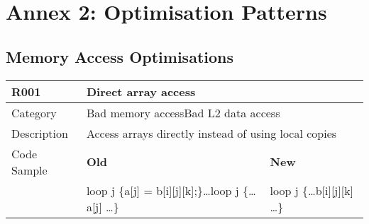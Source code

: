 \chapter{Annex 2: Optimisation Patterns}
\label{ch:ch07_optimization_patterns}

\section{Memory Access Optimisations}
\label{sec:Memory_Access_Optimizations}

\begin{tabular}{|p{0.9in}|p{2.0in}|p{2.0in}|} \hline
\textbf{R001}       & \multicolumn{2}{|p{4.0in}|}{\textbf{Direct array access}} \\ \hline
Category            & \multicolumn{2}{|p{4.0in}|}{Bad memory access\newline Bad L2 data access} \\ \hline
Description         & \multicolumn{2}{|p{4.0in}|}{Access arrays directly instead of using local copies} \\ \hline
Code Sample         & \textbf{Old}      & \textbf{New} \\ \hline
                    & loop j \{\newline   a[j] = b[i][j][k];\newline \}\newline \ldots\newline loop j \{\newline   \ldots a[j] \ldots\newline \}\newline
                    & loop j \{\newline   \ldots b[i][j][k] \ldots\newline \} \\ \hline
\end{tabular}

